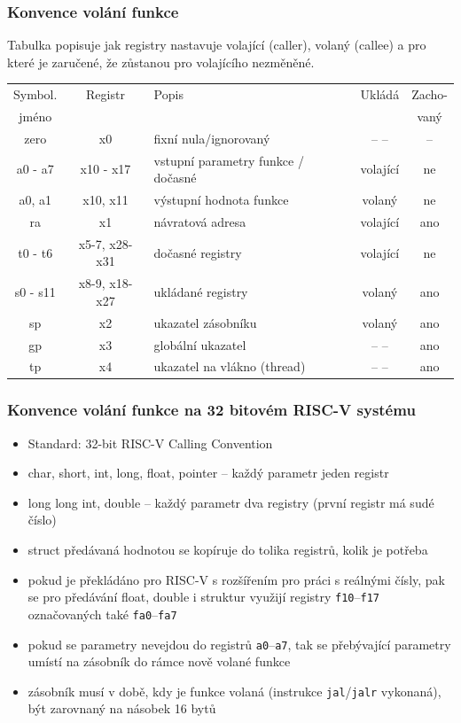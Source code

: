 \documentclass{beamer}
\begin{document}
\begin{frame}
\frametitle{Konvence volání funkce}

Tabulka popisuje jak registry nastavuje volající (caller), volaný (callee)
a pro které je zaručené, že zůstanou pro volajícího nezměněné.

\begin{tabular}{|c|c|p{4cm}|c|c|}\hline
Symbol. & Registr & Popis & Ukládá & Zacho- \\
   jméno   &         &       &        & vaný \\ \hline
zero & x0 & fixní nula/ignorovaný &  -- -- & --\\\hline
a0 - a7 & x10 - x17 & vstupní parametry funkce / dočasné & volající & ne\\\hline
a0, a1 & x10, x11 & výstupní hodnota funkce & volaný & ne\\\hline
ra & x1 & návratová adresa & volající & ano\\\hline
t0 - t6 & x5-7, x28-x31 & dočasné registry & volající & ne\\\hline
s0 - s11 & x8-9, x18-x27 & ukládané registry & volaný & ano\\\hline
sp & x2 & ukazatel zásobníku & volaný & ano\\\hline
gp & x3 & globální ukazatel & -- -- & ano\\\hline
tp & x4 & ukazatel na vlákno (thread) & -- -- & ano\\\hline
\end{tabular}
\end{frame}


\begin{frame}
\frametitle{Konvence volání funkce na 32 bitovém RISC-V systému}

\begin{itemize}
 \item Standard: 32-bit RISC-V Calling Convention
 \item char, short, int, long, float, pointer -- každý parametr jeden registr
 \item long long int, double -- každý parametr dva registry (první registr má sudé číslo)
 \item struct předávaná hodnotou se kopíruje do tolika registrů, kolik je potřeba
 \item pokud je překládáno pro RISC-V s rozšířením pro práci s reálnými čísly, pak se pro předávání float, double i struktur využijí registry \texttt{f10}--\texttt{f17} označovaných také \texttt{fa0}--\texttt{fa7}
 \item pokud se parametry nevejdou do registrů \texttt{a0}--\texttt{a7}, tak se přebývající parametry umístí na zásobník do rámce nově volané funkce
  \item zásobník musí v době, kdy je funkce volaná (instrukce \texttt{jal}/\texttt{jalr} vykonaná), být zarovnaný na násobek 16 bytů 
\end{itemize}
\end{frame}
\end{document}
